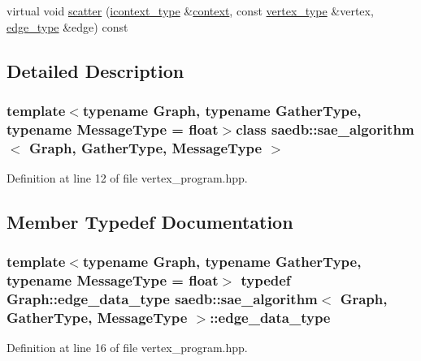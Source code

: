 \begin{DoxyCompactItemize}
\item 
virtual void \hyperlink{classsaedb_1_1sae__algorithm_a584008f538972457cf702cc8cac474bf}{scatter} (\hyperlink{classsaedb_1_1sae__algorithm_a190f07adbc04f0188ad09b50dbe93a33}{icontext\-\_\-type} \&\hyperlink{classsaedb_1_1context}{context}, const \hyperlink{classsaedb_1_1sae__algorithm_ae26abf349aed2b0c9f82e1396b78561a}{vertex\-\_\-type} \&vertex, \hyperlink{classsaedb_1_1sae__algorithm_aaebb1836596e0efad3d694a5b829871f}{edge\-\_\-type} \&edge) const 
\end{DoxyCompactItemize}


\subsection{Detailed Description}
\subsubsection*{template$<$typename Graph, typename Gather\-Type, typename Message\-Type = float$>$class saedb\-::sae\-\_\-algorithm$<$ Graph, Gather\-Type, Message\-Type $>$}



Definition at line 12 of file vertex\-\_\-program.\-hpp.



\subsection{Member Typedef Documentation}
\hypertarget{classsaedb_1_1sae__algorithm_a1d3acc631f0a3e22c830c91dcf104c8a}{
\subsubsection[{edge\-\_\-data\-\_\-type}]{\setlength{\rightskip}{0pt plus 5cm}template$<$typename Graph, typename Gather\-Type, typename Message\-Type = float$>$ typedef Graph\-::edge\-\_\-data\-\_\-type {\bf saedb\-::sae\-\_\-algorithm}$<$ Graph, Gather\-Type, Message\-Type $>$\-::{\bf edge\-\_\-data\-\_\-type}}}\label{d0/d9f/classsaedb_1_1sae__algorithm_a1d3acc631f0a3e22c830c91dcf104c8a}


Definition at line 16 of file vertex\-\_\-program.\-hpp.

